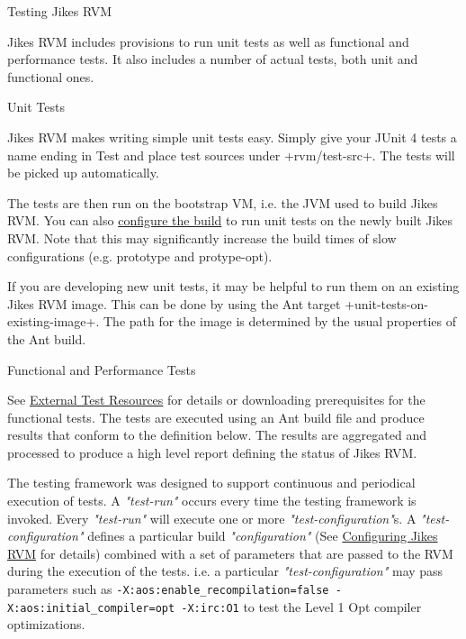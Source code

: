 \begin{chapter}{Testing Jikes RVM}
\label{cha:testingjikesrvm}

Jikes RVM includes provisions to run unit tests as well as functional and performance tests. It also includes a number of actual tests, both unit and functional ones.

\begin{section}{Unit Tests}

Jikes RVM makes writing simple unit tests easy. Simply give your JUnit 4 tests a name ending in Test and place test sources under \spverb+rvm/test-src+. The tests will be picked up automatically.

The tests are then run on the bootstrap VM, i.e. the JVM used to build Jikes RVM. You can also \hyperref[cha:buildingjikesrvm]{configure the build} to run unit tests on the newly built Jikes RVM. Note that this may significantly increase the build times of slow configurations (e.g. prototype and protype-opt).

If you are developing new unit tests, it may be helpful to run them on an existing Jikes RVM image. This can be done by using the Ant target \spverb+unit-tests-on-existing-image+. The path for the image is determined by the usual properties of the Ant build.
\end{section}

\begin{section}{Functional and Performance Tests}

See \hyperref[sec:externaltestresources]{External Test Resources} for details or downloading prerequisites for the functional tests. The tests are executed using an Ant build file and produce results that conform to the definition below. The results are aggregated and processed to produce a high level report defining the status of Jikes RVM.

The testing framework was designed to support continuous and periodical execution of tests. A \textit{"test-run"} occurs every time the testing framework is invoked. Every \textit{"test-run"} will execute one or more \textit{"test-configuration"}s. A \textit{"test-configuration"} defines a particular build \textit{"configuration"} (See \hyperref[cha:configuringjikesrvm]{Configuring Jikes RVM} for details) combined with a set of parameters that are passed to the RVM during the execution of the tests. i.e. a particular \textit{"test-configuration"} may pass parameters such as \texttt{-X:aos:enable\_recompilation=false -X:aos:initial\_compiler=opt -X:irc:O1} to test the Level 1 Opt compiler optimizations.


\end{section}
\end{chapter}

